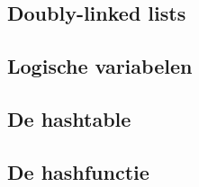 \subsection{Doubly-linked lists} \label{sec:impl-rt-dll}

\subsection{Logische variabelen} \label{sec:impl-rt-log}

\subsection{De hashtable} \label{sec:impl-rt-ht}

\subsection{De hashfunctie} \label{sec:impl-rt-hf}

% 

